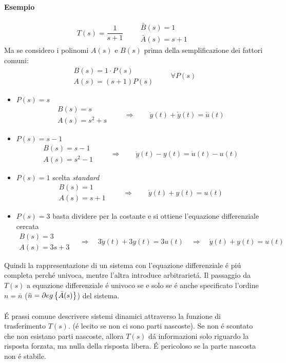 \documentclass[../main.tex]{subfiles}
\begin{document}
	\paragraph{Esempio}
	\[ T(s) = \frac{1}{s+1} \qquad \begin{array}{l} \bar{B}(s) = 1\\ \bar{A}(s) = s+1 \end{array} \]
	Ma se considero i polinomi $ A(s) $ e $ B(s) $ prima della semplificazione dei fattori comuni:
	\[ \begin{array}{l} B(s) = 1 \cdot P(s)\\ A(s) = (s+1)P(s) \end{array} \qquad \forall P(s) \]
	\begin{itemize}
		\item $ P(s) = s $
		\[ \begin{array}{l} B(s) = s\\ A(s) = s^2+s \end{array} \qquad \Rightarrow \qquad \ddot{y}(t) + \dot y(t) = \dot u(t)\]
		\item $ P(s) = s-1 $
		\[ \begin{array}{l} B(s) = s-1\\ A(s) = s^2-1 \end{array} \qquad \Rightarrow \qquad \ddot{y}(t) - y(t) = \dot{u}(t) - u(t)\]
		\item $ P(s) = 1 $ scelta \textit{standard}
		\[ \begin{array}{l} B(s) = 1\\ A(s) = s+1 \end{array} \qquad \Rightarrow \qquad \dot{y}(t) + y(t) = u(t)\]
		\item $ P(s) = 3 $ basta dividere per la costante e si ottiene l'equazione differenziale cercata
		\[ \begin{array}{l} B(s) = 3\\ A(s) = 3s+3 \end{array} \quad \Rightarrow \quad 3\dot{y}(t) + 3y(t) = 3u(t) \quad \Rightarrow \quad \dot{y}(t) + y(t) = u(t)\]
	\end{itemize}
	Quindi la rappresentazione di un sistema con l'equazione differenziale \'{e} pi\'u completa perch\'e univoca, mentre l'altra introduce arbitrariet\'a. Il passaggio da $ T(s) $ a equazione differenziale \'e univoco se e solo se \'e anche specificato l'ordine $ n = \bar n $ ($ \bar n = \partial eg \left\lbrace \bar A(s) \right\rbrace $) del sistema.\\
	\smallskip\\
	\'E prassi comune descrivere sistemi dinamici attraverso la funzione di trasferimento $ T(s) $. (\'e lecito se non ci sono parti nascoste). Se non \'e scontato che non esistano parti nascoste, allora $ T(s) $ d\'a informazioni solo riguardo la risposta forzata, ma nulla della risposta libera. \'E pericoloso se la parte nascosta non \'e stabile.\\
\end{document}

